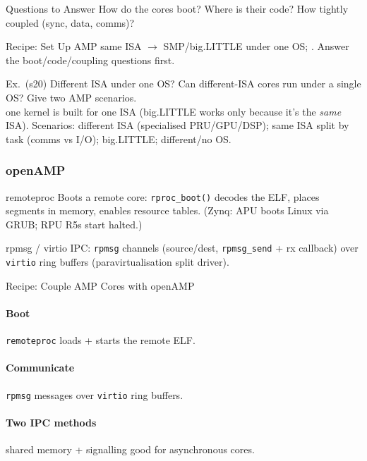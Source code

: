 \begin{concept}{Questions to Answer}
    How do the cores boot? Where is their code? How tightly coupled (sync, data, comms)?
\end{concept}

\multend

\begin{KR}{Recipe: Set Up AMP}
    same ISA $\to$ SMP/big.LITTLE under one OS; . Answer the boot/code/coupling questions first.
\end{KR}

\begin{example2}{Ex.\ (s20) Different ISA under one OS?}
    Can different-ISA cores run under a single OS? Give two AMP scenarios.
     \\ 
     one kernel is built for one ISA (big.LITTLE works only because it's the \emph{same} ISA). Scenarios: different ISA (specialised PRU/GPU/DSP); same ISA split by task (comms vs I/O); big.LITTLE; different/no OS.
\end{example2}

\subsubsection{openAMP}


\begin{definition}{remoteproc}
    Boots a remote core: \texttt{rproc\_boot()} decodes the ELF, places segments in memory, enables resource tables. (Zynq: APU boots Linux via GRUB; RPU R5s start halted.)
\end{definition}

\begin{definition}{rpmsg / virtio}
    IPC: \texttt{rpmsg} channels (source/dest, \texttt{rpmsg\_send} + rx callback) over \texttt{virtio} ring buffers (paravirtualisation split driver).
\end{definition}

\multend


\begin{KR}{Recipe: Couple AMP Cores with openAMP}
    \paragraph{Boot} \texttt{remoteproc} loads + starts the remote ELF.
    \paragraph{Communicate} \texttt{rpmsg} messages over \texttt{virtio} ring buffers.
    \paragraph{Two IPC methods} shared memory + signalling good for asynchronous cores.
\end{KR}

